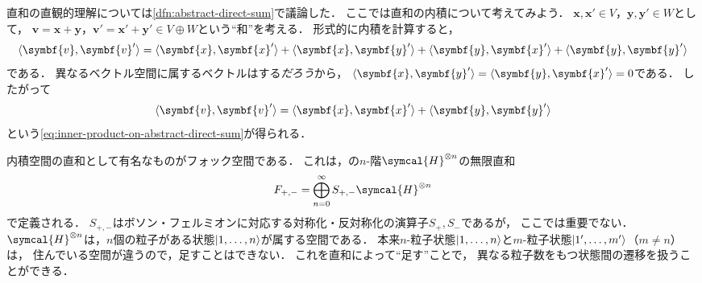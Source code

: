\documentclass[../sotsu.tex]{subfiles}
\begin{document}
直和の直観的理解については\cref{dfn:abstract-direct-sum}で議論した．
ここでは直和の内積について考えてみよう．
$\symbf{x}, \symbf{x}' \in V$，$\symbf{y}, \symbf{y}' \in W$として，
$\symbf{v} = \symbf{x} + \symbf{y}$，$\symbf{v}' = \symbf{x}' + \symbf{y}' \in V \oplus W$という``和''を考える．
形式的に内積を計算すると，
\begin{equation*}
    \iparen{ \symbf{v}, \symbf{v}' }
        = \iparen{ \symbf{x}, \symbf{x}' }
        + \iparen{ \symbf{x}, \symbf{y}' }
        + \iparen{ \symbf{y}, \symbf{x}' }
        + \iparen{ \symbf{y}, \symbf{y}' }
\end{equation*}
である．
異なるベクトル空間に属するベクトルはする\emph{だろう}から，
$\iparen{\symbf{x}, \symbf{y}'} = \iparen{\symbf{y}, \symbf{x}'} = 0$である．
したがって
\begin{equation*}
    \iparen{ \symbf{v}, \symbf{v}' }
        = \iparen{ \symbf{x}, \symbf{x}' }
        + \iparen{ \symbf{y}, \symbf{y}' }
\end{equation*}
という\cref{eq:inner-product-on-abstract-direct-sum}が得られる．

内積空間の直和として有名なものがフォック空間である．
これは，の$n$-階$\symcal{H}^{\otimes n}$の無限直和
\begin{equation*}
    F_{+,-} = \bigoplus_{n = 0}^{\infty} S_{+,-} \symcal{H}^{\otimes n}
\end{equation*}
で定義される．
$S_{+,-}$はボソン・フェルミオンに対応する対称化・反対称化の演算子$S_+, S_-$であるが，
ここでは重要でない．
$\symcal{H}^{\otimes n}$は，$n$個の粒子がある状態$\lvert1, \dots, n\rangle$が属する空間である．
本来$n$-粒子状態$\lvert1, \dots, n\rangle$と$m$-粒子状態$\lvert1', \dots, m'\rangle$（$m \neq n$）は，
住んでいる空間が違うので，足すことはできない．
これを直和によって``足す''ことで，
異なる粒子数をもつ状態間の遷移を扱うことができる．
\end{document}
